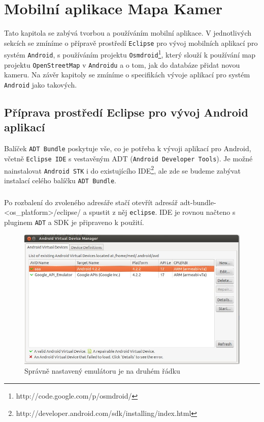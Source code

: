 \chapter{Mobilní aplikace Mapa Kamer}
Tato kapitola se zabývá tvorbou a používáním mobilní aplikace. V jednotlivých sekcích se zmíníme o přípravě prostředí \texttt{Eclipse} pro vývoj mobilních aplikací pro systém \texttt{Android}, s používáním projektu \texttt{Osmdroid}\footnote{http://code.google.com/p/osmdroid/}, který slouží k používání map projektu \texttt{OpenStreetMap} v \texttt{Androidu} a o tom, jak do databáze přidat novou kameru. Na závěr kapitoly se zmíníme o specifikách vývoje aplikací pro systém \texttt{Android} jako takových.
\section{Příprava prostředí Eclipse pro vývoj Android aplikací}
Balíček \texttt{ADT Bundle} poskytuje vše, co je potřeba k vývoji aplikací pro Android, včetně \texttt{Eclipse IDE} s vestavěným ADT (\texttt{Android Developer Tools}). Je možné nainstalovat \texttt{Android STK} i do existujícího IDE\footnote{http://developer.android.com/sdk/installing/index.html}, ale zde se budeme zabývat instalací celého balíčku \texttt{ADT Bundle}.
\paragraph{}
Po rozbalení do zvoleného adresáře stačí otevřít adresář adt-bundle-<os\_platform>/eclipse/ a spustit z něj \texttt{eclipse}. IDE je rovnou načteno s pluginem \texttt{ADT} a SDK je připraveno k použití.
\begin{figure}[hb]
\begin{center}
\includegraphics[scale=0.4]{pics/emulator_nastaveni.jpg}
\caption{Správně nastavený emulátoru je na druhém řádku}
\end{center}
\end{figure}
